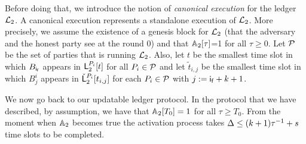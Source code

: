 

Before doing that, we introduce the notion of \emph{canonical execution} for the ledger $\mathcal{L}_2$. A canonical execution represents a standalone execution of $\mathcal{L}_2$. More precisely, 
we assume the existence of a genesis block for $\mathcal{L}_2$ (that the adversary and the honest party see at the round $0$) and that $\mathbb{A}_2[\tau]$=1 for all $\tau \geq 0$.
 Let $\mathcal{P}$ be the set of parties that is running $\mathcal{L}_2$. Also, 
let $t$ be the smallest time slot in which $B_{\mathsf{i_f}}$ appears in  $\mathsf{L}_2^{P_i}[t]$ for all $P_i\in\mathcal{P}$ 
and let $\tilde t_{i,j}$ be the smallest time slot in which $B^i_{j}$ appears in $\check {\mathsf{L}}_2^{P_i}[t_{i,j}]$ for each 
$P_i\in\mathcal{P}$ with $j:=\mathsf{i_f}+k+1$.


We now go back to our updatable ledger protocol.
In the protocol that we have described, by assumption, we have that $\mathbb{A}_2[T_0]=1$ for all $\tau \geq T_0$.
From the moment when $\mathbb{A}_2$ becomes true the activation process takes $\Delta\leq (k+1) \tau^{-1} + s$  time slots to be completed.

